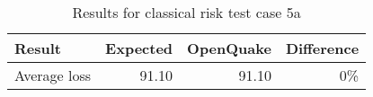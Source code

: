 \begin{table}[htbp]

\centering
\begin{tabular}{ l r r r }

\hline
\rowcolor{anti-flashwhite}
\bf{Result} & \bf{Expected} & \bf{OpenQuake} & \bf{Difference}\\
\hline
Average loss & 91.10 & 91.10 & 0\% \\
\hline
\end{tabular}

\caption{Results for classical risk test case 5a}
\label{tab:result-cr-5a}
\end{table}
